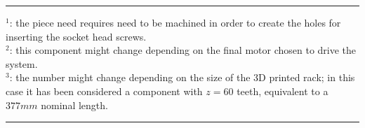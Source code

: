 \begin{table}[p]
\begin{center}
	\end{center}
	
	\vspace{3mm}
	\rule{\linewidth}{1pt}
	{
		\scriptsize
		$^1$: the piece need requires need to be machined in order to create the holes for inserting the socket head screws. \\
		$^2$: this component might change depending on the final motor chosen to drive the system. \\
		$^3$: the number might change depending on the size of the 3D printed rack; in this case it has been considered a component with $z=60$ teeth, equivalent to a $377mm$ nominal length.
	}	
	
	\rule{\linewidth}{2pt}
	
\end{table}